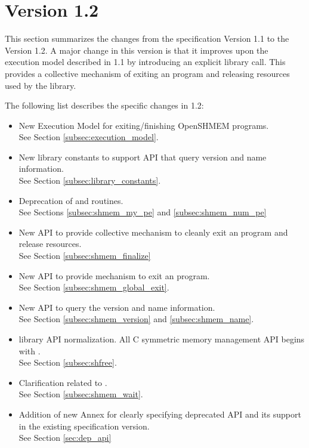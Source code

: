 \section{Version 1.2}
This section summarizes the changes from the \openshmem specification Version 1.1 to the Version 1.2.  
A major change in this version is that it improves upon the execution model described in 1.1 by introducing an explicit  library call. This provides a collective mechanism of exiting an \openshmem program and releasing resources used by the library.  



The following list describes the specific changes in 1.2:
\begin{itemize}
\item New Execution Model for exiting/finishing OpenSHMEM programs.
\\See Section  \ref{subsec:execution_model}.
\item New library constants to support API that query version and name information. 
\\See Section \ref{subsec:library_constants}.
\item Deprecation of  and  routines.
\\See Sections \ref{subsec:shmem_my_pe} and \ref{subsec:shmem_num_pe}
\item New API  to provide collective mechanism to cleanly exit an \openshmem program and release resources.
\\See Section \ref{subsec:shmem_finalize}
\item New API  to provide mechanism to exit an \openshmem program.
\\See Section \ref{subsec:shmem_global_exit}.
\item New API to query the version and name information. 
\\See Section \ref{subsec:shmem_version} and \ref{subsec:shmem_name}.
\item \openshmem library API normalization. All C symmetric memory management API begins with  .
\\See Section \ref{subsec:shfree}.
\item Clarification related to .
\\See Section \ref{subsec:shmem_wait}.
\item Addition of new Annex for clearly specifying deprecated API and its support in the existing specification version.
\\See Section \ref{sec:dep_api}

\end{itemize}
